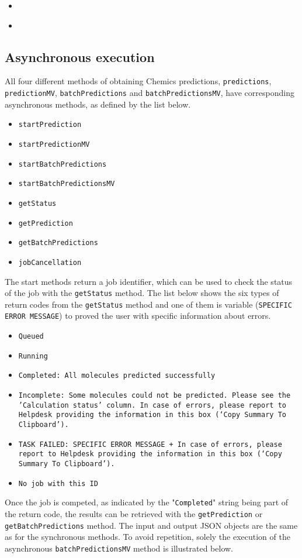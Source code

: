 \documentclass{article}
\newcommand{\insertcode}[2]{\begin{itemize}\item[]\end{itemize}} %
\begin{document}
\insertcode{"Scripts/testBatchPredictionMV.py"}{Calling the \texttt{batchPredictionMV} method.} %
\insertcode{"Scripts/testBatchPredictionMV.txt"}{Output of the \texttt{batchPredictionMV} method.} %


\subsection{Asynchronous execution}
All four different methods of obtaining Chemics predictions, \texttt{predictions}, \texttt{predictionMV}, \texttt{batchPredictions} and \texttt{batchPredictionsMV}, have corresponding 
asynchronous methods, as defined by the list below. 
\begin{itemize}
\item \texttt{startPrediction}
\item \texttt{startPredictionMV}
\item \texttt{startBatchPredictions}
\item \texttt{startBatchPredictionsMV}
\item \texttt{getStatus}
\item \texttt{getPrediction}
\item \texttt{getBatchPredictions}
\item \texttt{jobCancellation}
\end{itemize}
The start methods return a job identifier, which can be used to check the status of the job with the 
\texttt{getStatus} method. The list below shows the six types of return codes from the \texttt{getStatus} method and one of them is variable (\texttt{SPECIFIC ERROR MESSAGE}) 
to proved the user with specific information about errors.
\begin{itemize}
\item \texttt{Queued}
\item \texttt{Running}
\item \texttt{Completed: All molecules predicted successfully}
\item \texttt{Incomplete: Some molecules could not be predicted. Please see the 'Calculation status' column. In case of errors, please report to Helpdesk providing the information in this box (‘Copy Summary To Clipboard’).}
\item \texttt{TASK FAILED: SPECIFIC ERROR MESSAGE + In case of errors, please report to Helpdesk providing the information in this box (‘Copy Summary To Clipboard’).}
\item \texttt{No job with this ID}
\end{itemize}
Once the job is competed, as indicated by the "\texttt{Completed}" string being part of the return code, the results can be retrieved with the \texttt{getPrediction} or \texttt{getBatchPredictions} method.  The input and output 
JSON objects are the same as for the synchronous methods. To avoid repetition, solely the execution of the asynchronous \texttt{batchPredictionsMV} method is illustrated below. 
\end{document}
